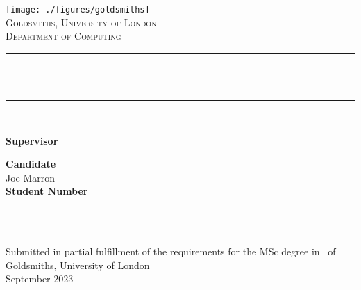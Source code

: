 \begin{titlepage}

\newcommand{\HRule}{\rule{\linewidth}{0.5mm}} %


\center %

\texttt{[image: ./figures/goldsmiths]}\\[2.5cm] 


\textsc{\Large Goldsmiths, University of London}\\[0.5cm] 
\textsc{\large Department of Computing}\\[0.5cm] 


\HRule \\[0.4cm]
{ \huge \bfseries \reporttitle } \\ %
\HRule \\[1.5cm]
 


\begin{minipage}[t]{0.4\textwidth}
	\textnormal{\bf Supervisor\\}
	{\large \supervisor} \hfill \break
\end{minipage}\hfill\begin{minipage}[t]{0.4\textwidth}\raggedleft
	\textnormal{{\bf Candidate\\}}
	{\large Joe Marron\\} \hfill \break
    \textnormal{{\bf Student Number\\}}
    {\large \studentid\\}
\end{minipage}

~

\vfill %
Submitted in partial fulfillment of the requirements for the MSc degree in
\degreetype~of Goldsmiths, University of London\\[0.5cm]

\makeatletter
September 2023
\makeatother

\end{titlepage}
